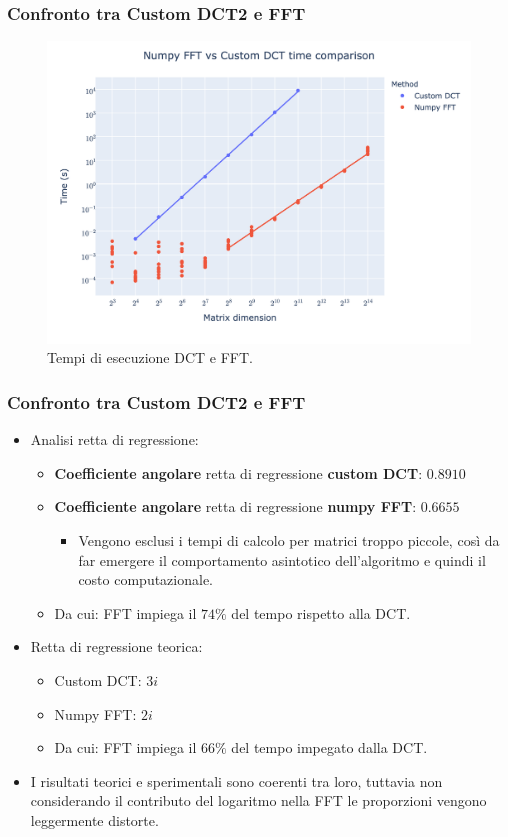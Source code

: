 \documentclass{beamer}
\begin{document}
\begin{frame}
\frametitle{Confronto tra Custom DCT2 e FFT}

	\begin{figure}
		\includegraphics[width=1\textheight]{assets/dct2.png}
		\caption{Tempi di esecuzione DCT e FFT.}
		\label{fig:dct2}
	\end{figure}

\end{frame}

\begin{frame}
	\frametitle{Confronto tra Custom DCT2 e FFT}
	\begin{itemize}
		\item Analisi retta di regressione:
		\begin{itemize}
					\item \textbf{Coefficiente angolare }retta di regressione \textbf{custom DCT}: $0.8910$
					\item \textbf{Coefficiente angolare }retta di regressione \textbf{numpy FFT}: $0.6655$
					\begin{itemize}
						\item Vengono esclusi i tempi di calcolo per matrici troppo piccole, così da far emergere il comportamento asintotico dell'algoritmo e quindi il costo computazionale.
					\end{itemize}
					\item Da cui: FFT impiega il $74\%$ del tempo rispetto alla DCT.
		\end{itemize}
	\item Retta di regressione teorica:
	\begin{itemize}
		\item Custom DCT: $3i$
		\item Numpy FFT: $2i$
		\item Da cui: FFT impiega il $66\%$ del tempo impegato dalla DCT.
	\end{itemize}
	\item I risultati teorici e sperimentali sono coerenti tra loro, tuttavia non considerando il contributo del logaritmo nella FFT le proporzioni vengono leggermente distorte.
	\end{itemize}
	
\end{frame}
\end{document}
